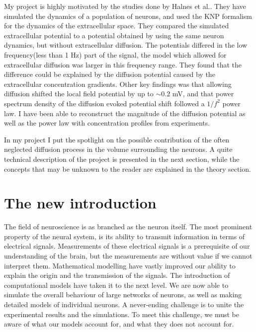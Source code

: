 \documentclass{article}
\begin{document}
My project is highly motivated by the studies done by Halnes et al.. They have simulated the dynamics of a population of neurons, and used the KNP formalism for the dynamics of the extracellular space. They compared the simulated extracellular potential to a potential obtained by using the same neuron dynamics, but without extracellular diffusion. The potentials differed in the low frequency(less than 1 Hz) part of the signal, the model which allowed for extracellular diffusion was larger in this frequency range. They found that the difference could be explained by the diffusion potential caused by the extracellular concentration gradients. Other key findings was that allowing diffusion shifted the local field potential by up to $\sim 0.2$ mV, and that power spectrum density of the diffusion evoked potential shift followed a $1/f^2$ power law. I have been able to reconstruct the magnitude of the diffusion potential as well as the power law with concentration profiles from experiments. 



In my project I put the spotlight on the possible contribution of the often neglected diffusion process in the volume surrounding the neurons. A quite technical description of the project is presented in the next section, while the concepts that may be unknown to the reader are explained in the theory section. 

\tableofcontents %
\section{The new introduction}

The field of neuroscience is as branched as the neuron itself. The most prominent property of the neural system, is its ability to transmit information in terms of electrical signals. Measurements of these electrical signals is a prerequisite of our understanding of the brain, but the measurements are without value if we cannot interpret them. Mathematical modelling have vastly improved our ability to explain the origin and the transmission of the signals. The introduction of computational models have taken it to the next level. We are now able to simulate the overall behaviour of large networks of neurons, as well as making detailed models of individual neurons. A never-ending challenge is to unite the experimental results and the simulations. To meet this challenge, we must be aware of what our models account for, and what they does not account for. 
\end{document}
